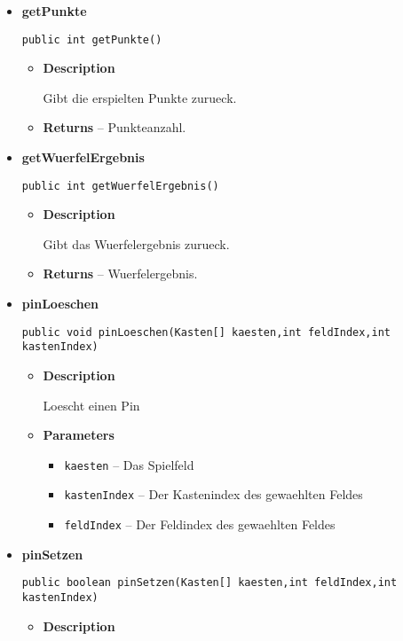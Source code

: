 \documentclass[11pt,a4paper]{report}
\begin{document}
{{{{{{{{{{{\begin{itemize}
{\begin{itemize}
{Gibt den Namen des Spielers zurueck.
}
\item{{\bf  Returns} -- 
Der Name des Spielers. 
}%
\end{itemize}
}%
\item{ 
{\bf  getPunkte}\\
\begin{lstlisting}[frame=none]
public int getPunkte()\end{lstlisting} %
\begin{itemize}
\item{
{\bf  Description}

Gibt die erspielten Punkte zurueck.
}
\item{{\bf  Returns} -- 
Punkteanzahl. 
}%
\end{itemize}
}%
\item{ 
{\bf  getWuerfelErgebnis}\\
\begin{lstlisting}[frame=none]
public int getWuerfelErgebnis()\end{lstlisting} %
\begin{itemize}
\item{
{\bf  Description}

Gibt das Wuerfelergebnis zurueck.
}
\item{{\bf  Returns} -- 
Wuerfelergebnis. 
}%
\end{itemize}
}%
\item{ 
{\bf  pinLoeschen}\\
\begin{lstlisting}[frame=none]
public void pinLoeschen(Kasten[] kaesten,int feldIndex,int kastenIndex)\end{lstlisting} %
\begin{itemize}
\item{
{\bf  Description}

Loescht einen Pin
}
\item{
{\bf  Parameters}
  \begin{itemize}
   \item{
\texttt{kaesten} -- Das Spielfeld}
   \item{
\texttt{kastenIndex} -- Der Kastenindex des gewaehlten Feldes}
   \item{
\texttt{feldIndex} -- Der Feldindex des gewaehlten Feldes}
  \end{itemize}
}%
\end{itemize}
}%
\item{ 
{\bf  pinSetzen}\\
\begin{lstlisting}[frame=none]
public boolean pinSetzen(Kasten[] kaesten,int feldIndex,int kastenIndex)\end{lstlisting} %
\begin{itemize}
\item{
{\bf  Description}

}
\end{itemize}}
\end{itemize}}}}}}}}}}}}
\end{document}
